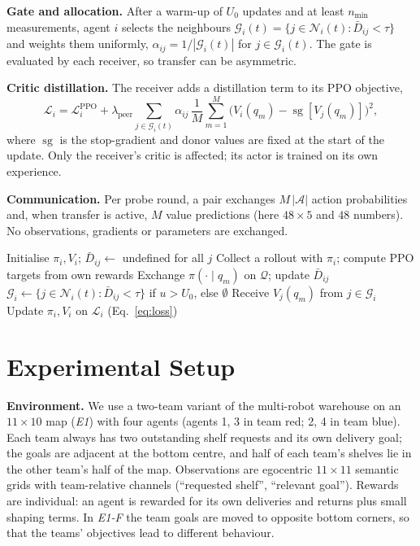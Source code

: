 \documentclass{article}
\newcommand{\sg}{\operatorname{sg}}
\newcommand{\ours}{PGCT}
\begin{document}
\textbf{Gate and allocation.} After a warm-up of $U_0$ updates and at least $n_{\min}$ measurements, agent $i$
selects the neighbours $\mathcal{G}_i(t)=\{j\in\mathcal{N}_i(t): \bar D_{ij}<\tau\}$ and weights them uniformly,
$\alpha_{ij}=1/|\mathcal{G}_i(t)|$ for $j\in\mathcal{G}_i(t)$. The gate is evaluated by each receiver, so transfer
can be asymmetric.

\textbf{Critic distillation.} The receiver adds a distillation term to its PPO objective,
\begin{equation}
  \mathcal{L}_i = \mathcal{L}^{\mathrm{PPO}}_i + \lambda_{\mathrm{peer}} \sum_{j\in\mathcal{G}_i(t)} \alpha_{ij}\,
  \frac{1}{M}\sum_{m=1}^{M}\big(V_i(q_m) - \sg[V_j(q_m)]\big)^2 ,
  \label{eq:loss}
\end{equation}
where $\sg$ is the stop-gradient and donor values are fixed at the start of the update. Only the receiver's
critic is affected; its actor is trained on its own experience.

\textbf{Communication.} Per probe round, a pair exchanges $M\,|\mathcal{A}|$ action probabilities and, when
transfer is active, $M$ value predictions (here $48\times5$ and $48$ numbers). No observations, gradients or
parameters are exchanged.

\begin{algorithm}[t]
\caption{\ours{} for agent $i$}
\label{alg:pgct}
\begin{algorithmic}[1]
\State Initialise $\pi_i, V_i$; $\bar D_{ij}\gets$ undefined for all $j$
  \State Collect a rollout with $\pi_i$; compute PPO targets from own rewards
      \State Exchange $\pi(\cdot\mid q_m)$ on $\mathcal{Q}$; update $\bar D_{ij}$
    \EndFor
  \EndIf
  \State $\mathcal{G}_i\gets\{j\in\mathcal{N}_i(t): \bar D_{ij}<\tau\}$ if $u>U_0$, else $\emptyset$
  \State Receive $V_j(q_m)$ from $j\in\mathcal{G}_i$
  \State Update $\pi_i, V_i$ on $\mathcal{L}_i$ (Eq.~\ref{eq:loss})
\EndFor
\end{algorithmic}
\end{algorithm}

\section{Experimental Setup}
\label{sec:setup}
\textbf{Environment.} We use a two-team variant of the multi-robot warehouse \cite{papoudakis2021benchmarking}
on an $11\times10$ map (\emph{E1}) with four agents (agents 1, 3 in team red; 2, 4 in team blue). Each team
always has two outstanding shelf requests and its own delivery goal; the goals are adjacent at the bottom centre,
and half of each team's shelves lie in the other team's half of the map. Observations are egocentric $11\times11$
semantic grids with team-relative channels (``requested shelf'', ``relevant goal''). Rewards are individual: an agent
is rewarded for its own deliveries and returns plus small shaping terms. In \emph{E1-F} the team goals are moved to
opposite bottom corners, so that the teams' objectives lead to different behaviour.
\end{document}
